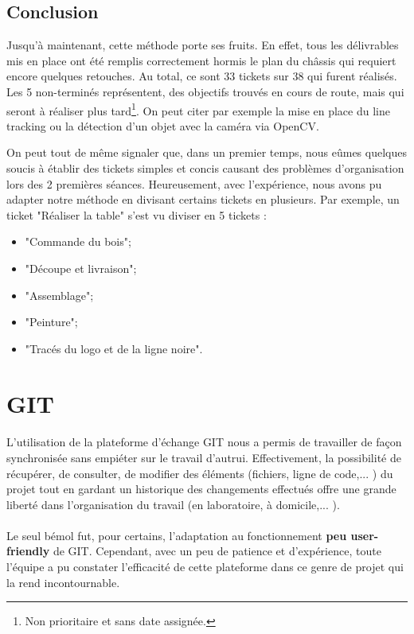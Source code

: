\subsection{Conclusion}

Jusqu'à maintenant, cette méthode porte ses fruits. En effet, tous les délivrables mis en place ont été remplis correctement hormis le plan du châssis qui requiert encore quelques retouches. Au total, ce sont 33 tickets sur 38 qui furent réalisés. Les 5 non-terminés représentent, des objectifs trouvés en cours de route, mais qui seront à réaliser plus tard\footnote{Non prioritaire et sans date assignée.}. On peut citer par exemple la mise en place du line tracking ou la détection d'un objet avec la caméra via OpenCV.

\noindent On peut tout de même signaler que, dans un premier temps, nous eûmes quelques soucis à établir des tickets simples et concis causant des problèmes d'organisation lors des 2 premières séances. Heureusement, avec l'expérience, nous avons pu adapter notre méthode en divisant certains tickets en plusieurs. Par exemple, un ticket "Réaliser la table" s'est vu diviser en 5 tickets : 
\begin{itemize}
	\item "Commande du bois";
	\item "Découpe et livraison";
	\item "Assemblage";
	\item "Peinture";
	\item "Tracés du logo et de la ligne noire".
\end{itemize}

\section{GIT}
\paragraph{}
L'utilisation de la plateforme d'échange GIT nous a permis de travailler de façon synchronisée sans empiéter sur le travail d'autrui. Effectivement, la possibilité de récupérer, de consulter, de modifier des éléments (fichiers, ligne de code,... ) du projet tout en gardant un historique des changements effectués offre une grande liberté dans l'organisation du travail (en laboratoire, à domicile,... ).

\paragraph{}
Le seul bémol fut, pour certains, l'adaptation au fonctionnement \textbf{peu user-friendly} de GIT. Cependant, avec un peu de patience et d'expérience, toute l'équipe a pu constater l'efficacité de cette plateforme dans ce genre de projet qui la rend incontournable.

